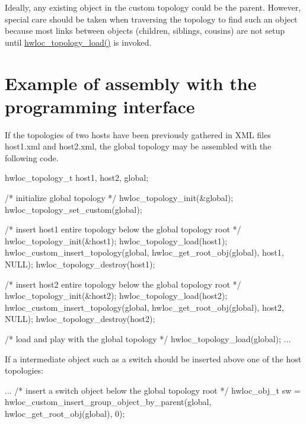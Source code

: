 Ideally, any existing object in the custom topology could be the parent. However, special care should be taken when traversing the topology to find such an object because most links between objects (children, siblings, cousins) are not setup until \hyperlink{a00043_ga91e2e6427b95fb7339c99dbbef996e71}{hwloc\_\-topology\_\-load()} is invoked.\hypertarget{a00006_multinode_example}{}\section{Example of assembly with the programming interface}\label{a00006_multinode_example}
If the topologies of two hosts have been previously gathered in XML files {\ttfamily host1.xml} and {\ttfamily host2.xml}, the global topology may be assembled with the following code.


\begin{DoxyPre}
hwloc\_topology\_t host1, host2, global;\end{DoxyPre}



\begin{DoxyPre}/* initialize global topology */
hwloc\_topology\_init(&global);
hwloc\_topology\_set\_custom(global);\end{DoxyPre}



\begin{DoxyPre}/* insert host1 entire topology below the global topology root */
hwloc\_topology\_init(&host1);
hwloc\_topology\_load(host1);
hwloc\_custom\_insert\_topology(global, hwloc\_get\_root\_obj(global),
                             host1, NULL);
hwloc\_topology\_destroy(host1);\end{DoxyPre}



\begin{DoxyPre}/* insert host2 entire topology below the global topology root */
hwloc\_topology\_init(&host2);
hwloc\_topology\_load(host2);
hwloc\_custom\_insert\_topology(global, hwloc\_get\_root\_obj(global),
                             host2, NULL);
hwloc\_topology\_destroy(host2);\end{DoxyPre}



\begin{DoxyPre}/* load and play with the global topology */
hwloc\_topology\_load(global);
...
\end{DoxyPre}


If a intermediate object such as a switch should be inserted above one of the host topologies: 
\begin{DoxyPre}
...
/* insert a switch object below the global topology root */
hwloc\_obj\_t sw =
   hwloc\_custom\_insert\_group\_object\_by\_parent(global,
                              hwloc\_get\_root\_obj(global), 0);\end{DoxyPre}



